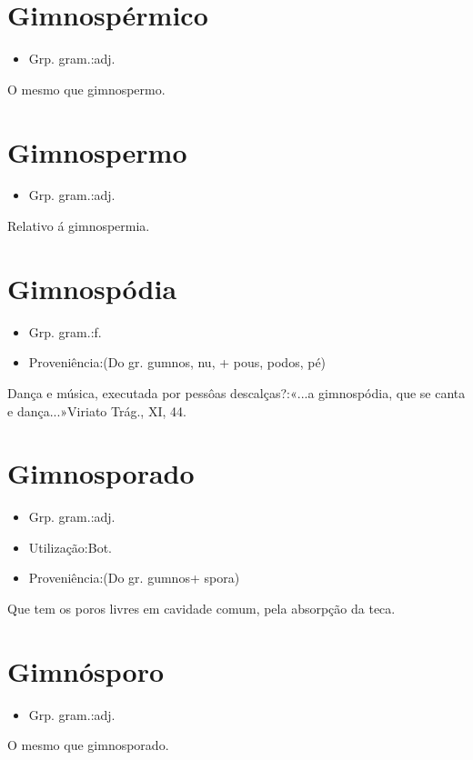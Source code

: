 \section{Gimnospérmico}
\begin{itemize}
\item {Grp. gram.:adj.}
\end{itemize}
O mesmo que \textunderscore gimnospermo\textunderscore .
\section{Gimnospermo}
\begin{itemize}
\item {Grp. gram.:adj.}
\end{itemize}
Relativo á gimnospermia.
\section{Gimnospódia}
\begin{itemize}
\item {Grp. gram.:f.}
\end{itemize}
\begin{itemize}
\item {Proveniência:(Do gr. \textunderscore gumnos\textunderscore , nu, + \textunderscore pous\textunderscore , \textunderscore podos\textunderscore , pé)}
\end{itemize}
Dança e música, executada por pessôas descalças?:«\textunderscore ...a gimnospódia, que se canta e dança...\textunderscore »\textunderscore Viriato Trág.\textunderscore , XI, 44.
\section{Gimnosporado}
\begin{itemize}
\item {Grp. gram.:adj.}
\end{itemize}
\begin{itemize}
\item {Utilização:Bot.}
\end{itemize}
\begin{itemize}
\item {Proveniência:(Do gr. \textunderscore gumnos\textunderscore  + \textunderscore spora\textunderscore )}
\end{itemize}
Que tem os poros livres em cavidade comum, pela absorpção da teca.
\section{Gimnósporo}
\begin{itemize}
\item {Grp. gram.:adj.}
\end{itemize}
O mesmo que \textunderscore gimnosporado\textunderscore .
